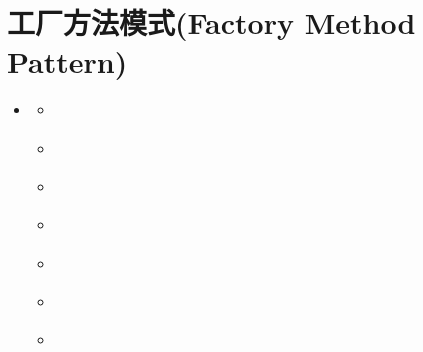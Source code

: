 \documentclass[letterpaper,10pt,english]{sphinxmanual}
\begin{document}
\section{工厂方法模式(Factory Method Pattern)}
\label{\detokenize{creational_patterns/factory_method:factory-method-pattern}}\label{\detokenize{creational_patterns/factory_method:factory-method}}\label{\detokenize{creational_patterns/factory_method::doc}}
\begin{sphinxShadowBox}
\begin{itemize}
\item {} 
\sphinxAtStartPar
{}\label{\detokenize{creational_patterns/factory_method:id15}}{\hyperref[\detokenize{creational_patterns/factory_method:factory-method-pattern}]{}}
\begin{itemize}
\item {} 
\sphinxAtStartPar
{}\label{\detokenize{creational_patterns/factory_method:id16}}{\hyperref[\detokenize{creational_patterns/factory_method:id2}]{}}

\item {} 
\sphinxAtStartPar
{}\label{\detokenize{creational_patterns/factory_method:id17}}{\hyperref[\detokenize{creational_patterns/factory_method:id3}]{}}

\item {} 
\sphinxAtStartPar
{}\label{\detokenize{creational_patterns/factory_method:id18}}{\hyperref[\detokenize{creational_patterns/factory_method:id4}]{}}

\item {} 
\sphinxAtStartPar
{}\label{\detokenize{creational_patterns/factory_method:id19}}{\hyperref[\detokenize{creational_patterns/factory_method:id5}]{}}

\item {} 
\sphinxAtStartPar
{}\label{\detokenize{creational_patterns/factory_method:id20}}{\hyperref[\detokenize{creational_patterns/factory_method:id6}]{}}

\item {} 
\sphinxAtStartPar
{}\label{\detokenize{creational_patterns/factory_method:id21}}{\hyperref[\detokenize{creational_patterns/factory_method:id7}]{}}

\item {} 
\sphinxAtStartPar
{}\label{\detokenize{creational_patterns/factory_method:id22}}{\hyperref[\detokenize{creational_patterns/factory_method:id8}]{}}


\end{itemize}
\end{itemize}
\end{sphinxShadowBox}
\end{document}

